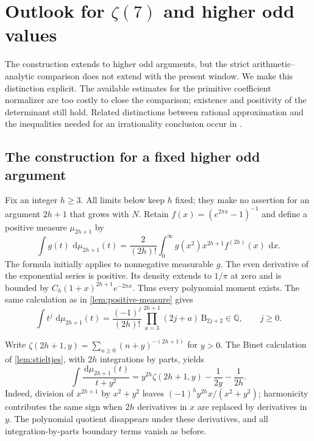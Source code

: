 \documentclass[11pt,letterpaper]{article}
\theoremstyle{definition}
\newcommand{\Q}{\mathbb Q}
\newcommand{\dd}{\,\mathrm d}
\begin{document}

\section{Outlook for \texorpdfstring{$\zeta(7)$}{zeta(7)} and higher odd values}\label{sec:higher-odd}

The construction extends to higher odd arguments, but the strict
arithmetic--analytic comparison does not extend with the present window.
We make this distinction explicit. The available estimates for the primitive
coefficient normalizer are too costly to close the comparison; existence and
positivity of the determinant still hold. Related distinctions between rational approximation and the
inequalities needed for an irrationality conclusion occur in
\cite{prevostrivoal2021,zudilin2017}.

\subsection{The construction for a fixed higher odd argument}

Fix an integer $h\ge3$. All limits below keep $h$ fixed; they make no
assertion for an argument $2h+1$ that grows with $N$. Retain
$f(x)=(e^{2\pi x}-1)^{-1}$ and define a positive measure $\mu_{2h+1}$ by
\begin{equation}\label{eq:higher-measure}
 \int g(t)\,\dd\mu_{2h+1}(t)
 =\frac{2}{(2h)!}\int_0^\infty
       g(x^2)x^{2h+1}f^{(2h)}(x)\,\dd x.
\end{equation}
The formula initially applies to nonnegative measurable $g$.
The even derivative of the exponential series is positive. Its density
extends to $1/\pi$ at zero and is bounded by
$C_h(1+x)^{2h+1}e^{-2\pi x}$. Thus every polynomial moment exists.
The same calculation as in \cref{lem:positive-measure} gives
\begin{equation}\label{eq:higher-moments}
 \int t^j\,\dd\mu_{2h+1}(t)
 =\frac{(-1)^j}{(2h)!}
       \prod_{a=3}^{2h+1}(2j+a)\,\mathrm B_{2j+2}
 \in\Q,\qquad j\ge0.
\end{equation}

Write $\zeta(2h+1,y)=\sum_{n\ge0}(n+y)^{-(2h+1)}$ for $y>0$.
The Binet calculation of \cref{lem:stieltjes}, with $2h$ integrations
by parts, yields
\begin{equation}\label{eq:higher-stieltjes}
 \int\frac{\dd\mu_{2h+1}(t)}{t+y^2}
 =y^{2h}\zeta(2h+1,y)-\frac1{2y}-\frac1{2h}.
\end{equation}
Indeed, division of $x^{2h+1}$ by $x^2+y^2$ leaves
$(-1)^hy^{2h}x/(x^2+y^2)$; harmonicity contributes the same sign
when $2h$ derivatives in $x$ are replaced by derivatives in $y$.
The polynomial quotient disappears under these derivatives, and all
integration-by-parts boundary terms vanish as before.
\end{document}
